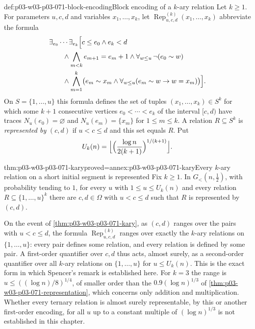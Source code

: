 \begin{hbdefinition}{def:p03-w03-p03-071-block-encoding}{Block encoding of a \(k\)-ary relation}
Let \(k\geq1\).  For parameters \(u,c,d\) and variables
\(x_1,\ldots,x_k\), let \(\operatorname{Rep}^{(k)}_{u,c,d}(x_1,\ldots,x_k)\)
abbreviate the formula
\begin{align*}
  &\exists_{e_0}\cdots\exists_{e_k}\Bigl[c\leq e_0\wedge e_k<d\\
  &\qquad\wedge\bigwedge_{m<k}e_{m+1}=e_m+1
  \wedge\forall_{w\leq u}\,\neg(e_0\sim w)\\
  &\qquad\wedge\bigwedge_{m=1}^{k}\bigl(e_m\sim x_m\wedge
  \forall_{w\leq u}(e_m\sim w\to w=x_m)\bigr)\Bigr].
\end{align*}
On \(S=\{1,\ldots,u\}\) this formula defines the set of tuples
\((x_1,\ldots,x_k)\in S^k\) for which some \(k+1\) consecutive vertices
\(e_0<\cdots<e_k\) of the interval \([c,d)\) have traces
\(N_u(e_0)=\varnothing\) and \(N_u(e_m)=\{x_m\}\) for \(1\leq m\leq k\).  A
relation \(R\subseteq S^k\) is \emph{represented by} \((c,d)\) if
\(u<c\leq d\) and this set equals \(R\).  Put
\[
  U_k(n)=\Bigl\lfloor\Bigl(\frac{\log n}{2(k+1)}\Bigr)^{1/(k+1)}\Bigr\rfloor .
\]
\end{hbdefinition}

\begin{hbtheorem}{thm:p03-w03-p03-071-kary}{proved=annex:p03-w03-p03-071-kary}{Every \(k\)-ary relation on a short initial segment is represented}
Fix \(k\geq1\).  In \(G_<(n,\frac12)\), with probability tending to \(1\),
for every \(u\) with \(1\leq u\leq U_k(n)\) and every relation
\(R\subseteq\{1,\ldots,u\}^k\) there are \(c,d\in\Omega\) with \(u<c\leq d\)
such that \(R\) is represented by \((c,d)\).
\end{hbtheorem}

On the event of \cref{thm:p03-w03-p03-071-kary}, as \((c,d)\) ranges over
the pairs with \(u<c\leq d\), the formula
\(\operatorname{Rep}^{(k)}_{u,c,d}\) ranges over exactly the \(k\)-ary
relations on \(\{1,\ldots,u\}\): every pair defines some relation, and every
relation is defined by some pair.  A first-order quantifier over \(c,d\) thus
acts, almost surely, as a second-order quantifier over all \(k\)-ary
relations on \(\{1,\ldots,u\}\) for \(u\leq U_k(n)\).  This is the exact form
in which Spencer's remark is established here.  For \(k=3\) the range is
\(u\leq((\log n)/8)^{1/4}\), of smaller order than the \(0.9(\log n)^{1/3}\) of
\cref{thm:p03-w03-p03-071-representation}, which concerns only addition and
multiplication.  Whether every ternary relation is almost surely
representable, by this or another first-order encoding, for all \(u\) up to
a constant multiple of \((\log n)^{1/3}\) is not established in this chapter.

